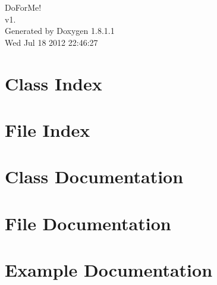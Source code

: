 \documentclass{book}
\begin{document}
\hypersetup{pageanchor=false,citecolor=blue}
\begin{titlepage}
\vspace*{7cm}
\begin{center}
{\Large Do\-For\-Me! \\[1ex]\large v1. }\\
\vspace*{1cm}
{\large Generated by Doxygen 1.8.1.1}\\
\vspace*{0.5cm}
{\small Wed Jul 18 2012 22:46:27}\\
\end{center}
\end{titlepage}
\clearemptydoublepage
{}
\tableofcontents
\clearemptydoublepage
{}
\hypersetup{pageanchor=true,citecolor=blue}
\chapter{Class Index}

\chapter{File Index}

\chapter{Class Documentation}








\chapter{File Documentation}


















\chapter{Example Documentation}

\printindex
\end{document}

